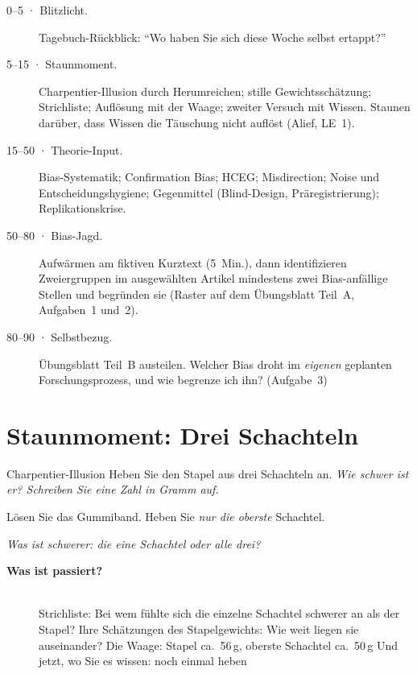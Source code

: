 \begin{ablauf}
\begin{description}
\item[0--5 · Blitzlicht.] Tagebuch-Rückblick: \enquote{Wo haben Sie sich
  diese Woche selbst ertappt?}
\item[5--15 · Staunmoment.] Charpentier-Illusion durch Herumreichen;
  stille Gewichtsschätzung; Strichliste; Auflösung mit der Waage;
  zweiter Versuch mit Wissen. Staunen darüber, dass Wissen die Täuschung
  nicht auflöst (Alief, LE~1).
\item[15--50 · Theorie-Input.] Bias-Systematik; Confirmation Bias; HCEG;
  Misdirection; Noise und Entscheidungshygiene; Gegenmittel
  (Blind-Design, Präregistrierung); Replikationskrise.
\item[50--80 · Bias-Jagd.] Aufwärmen am fiktiven Kurztext (5~Min.), dann
  identifizieren Zweiergruppen im ausgewählten Artikel mindestens zwei
  Bias-anfällige Stellen und begründen sie (Raster auf dem Übungsblatt
  Teil~A, Aufgaben~1 und~2).
\item[80--90 · Selbstbezug.] Übungsblatt Teil~B austeilen. Welcher Bias
  droht im \emph{eigenen} geplanten Forschungsprozess, und wie begrenze
  ich ihn? (Aufgabe~3)
\end{description}
\end{ablauf}

\section{Staunmoment: Drei Schachteln}
\begin{staunbox}{Charpentier-Illusion}
Heben Sie den Stapel aus drei Schachteln an. \emph{Wie schwer ist er?
Schreiben Sie eine Zahl in Gramm auf.}

\medskip
Lösen Sie das Gummiband. Heben Sie \emph{nur die oberste} Schachtel.

\medskip
\emph{Was ist schwerer: die eine Schachtel oder alle drei?}
\end{staunbox}
\os{\newpage}

\begin{description}
\item[{\rot\bf Was ist passiert?}]~\\[-\lblskip]
\bi
  \ite Strichliste: Bei wem fühlte sich die einzelne Schachtel schwerer
    an als der Stapel?
  \ite Ihre Schätzungen des Stapelgewichts: Wie weit liegen sie
    auseinander?
  \ite Die Waage: Stapel ca.\ 56\,g, oberste Schachtel ca.\ 50\,g
  \ite Und jetzt, wo Sie es wissen: noch einmal heben
\ei
\os{\newpage}
\end{description}

